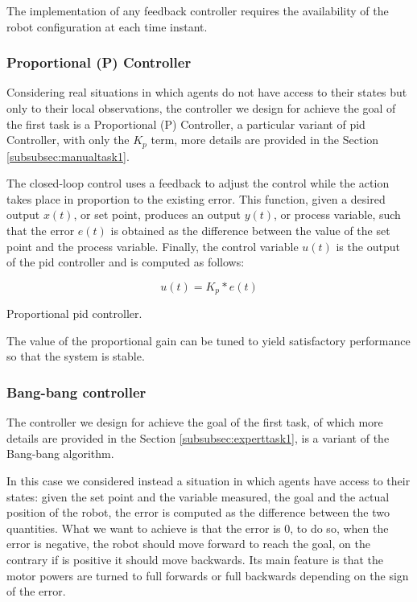 The implementation of any feedback controller requires the availability of the 
robot configuration at each time instant. 

\subsubsection{Proportional (P) Controller}
\label{subsubsec:pid}

Considering real situations in which agents do not have access to their states but 
only to their local observations, the controller we design for achieve the goal of 
the first task is a Proportional (P) Controller,  a particular variant of \gls{pid} 
Controller, with only the $K_p$ term, more details are provided in the Section 
\ref{subsubsec:manualtask1}.

The closed-loop control uses a feedback to adjust the control while the action 
takes place in proportion to the existing error. This function, given a desired 
output $x(t)$, or set point, produces an output $y(t)$, or process variable, such 
that the error $e(t)$ is obtained as the difference between the value of the set 
point and the process variable. Finally, the control variable $u(t)$ is the output of 
the \gls{pid} controller and is computed as follows:
\begin{Equation}[!h]
	\centering
	\begin{equation}
	u(t) = K_p * e(t)
	\end{equation}
	\caption[Proportioal PID controller.]{Proportional \gls{pid} controller.}
	\label{eq:pid}
\end{Equation}

The value of the proportional gain can be tuned to yield satisfactory 
performance so that the system is stable.

\subsubsection{Bang-bang controller}
\label{subsubsec:bangbang}
The controller we design for achieve the goal of the first task, of which more 
details are provided in the Section \ref{subsubsec:experttask1}, is a variant of the 
Bang-bang algorithm.

In this case we considered instead a situation in which agents have access to their 
states: given the set point and the variable measured, the goal and the actual 
position of the robot, the error is computed as the difference between the two 
quantities.
What we want to achieve is that the error is 0, to do so, when the error is negative, 
the robot should move forward to reach the goal, on the contrary if is positive it 
should move backwards. Its main feature is that the motor powers are turned to 
full forwards or full backwards depending on the sign of the error. 

